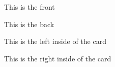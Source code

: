 \documentclass[a5paper,landscape]{scrartcl}
\begin{document}
\begin{multicols}{2}

This is the front

\columnbreak

This is the back

\end{multicols}

\pagebreak

\begin{multicols}{2}

This is the left inside of the card

\columnbreak

This is the right inside of the card

\end{multicols}
\end{document}
